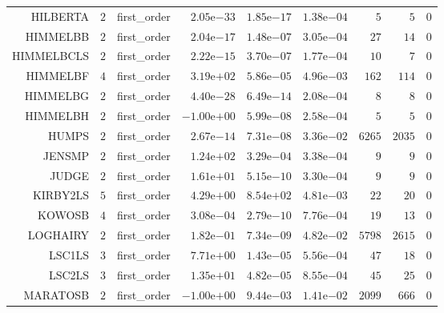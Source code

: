 \begin{longtable}{rrrrrrrrr}
HILBERTA & \(     2\) & first\_order & \( 2.05\)e\(-33\) & \( 1.85\)e\(-17\) & \( 1.38\)e\(-04\) & \(     5\) & \(     5\) & \(     0\) \\
HIMMELBB & \(     2\) & first\_order & \( 2.04\)e\(-17\) & \( 1.48\)e\(-07\) & \( 3.05\)e\(-04\) & \(    27\) & \(    14\) & \(     0\) \\
HIMMELBCLS & \(     2\) & first\_order & \( 2.22\)e\(-15\) & \( 3.70\)e\(-07\) & \( 1.77\)e\(-04\) & \(    10\) & \(     7\) & \(     0\) \\
HIMMELBF & \(     4\) & first\_order & \( 3.19\)e\(+02\) & \( 5.86\)e\(-05\) & \( 4.96\)e\(-03\) & \(   162\) & \(   114\) & \(     0\) \\
HIMMELBG & \(     2\) & first\_order & \( 4.40\)e\(-28\) & \( 6.49\)e\(-14\) & \( 2.08\)e\(-04\) & \(     8\) & \(     8\) & \(     0\) \\
HIMMELBH & \(     2\) & first\_order & \(-1.00\)e\(+00\) & \( 5.99\)e\(-08\) & \( 2.58\)e\(-04\) & \(     5\) & \(     5\) & \(     0\) \\
HUMPS & \(     2\) & first\_order & \( 2.67\)e\(-14\) & \( 7.31\)e\(-08\) & \( 3.36\)e\(-02\) & \(  6265\) & \(  2035\) & \(     0\) \\
JENSMP & \(     2\) & first\_order & \( 1.24\)e\(+02\) & \( 3.29\)e\(-04\) & \( 3.38\)e\(-04\) & \(     9\) & \(     9\) & \(     0\) \\
JUDGE & \(     2\) & first\_order & \( 1.61\)e\(+01\) & \( 5.15\)e\(-10\) & \( 3.30\)e\(-04\) & \(     9\) & \(     9\) & \(     0\) \\
KIRBY2LS & \(     5\) & first\_order & \( 4.29\)e\(+00\) & \( 8.54\)e\(+02\) & \( 4.81\)e\(-03\) & \(    22\) & \(    20\) & \(     0\) \\
KOWOSB & \(     4\) & first\_order & \( 3.08\)e\(-04\) & \( 2.79\)e\(-10\) & \( 7.76\)e\(-04\) & \(    19\) & \(    13\) & \(     0\) \\
LOGHAIRY & \(     2\) & first\_order & \( 1.82\)e\(-01\) & \( 7.34\)e\(-09\) & \( 4.82\)e\(-02\) & \(  5798\) & \(  2615\) & \(     0\) \\
LSC1LS & \(     3\) & first\_order & \( 7.71\)e\(+00\) & \( 1.43\)e\(-05\) & \( 5.56\)e\(-04\) & \(    47\) & \(    18\) & \(     0\) \\
LSC2LS & \(     3\) & first\_order & \( 1.35\)e\(+01\) & \( 4.82\)e\(-05\) & \( 8.55\)e\(-04\) & \(    45\) & \(    25\) & \(     0\) \\
MARATOSB & \(     2\) & first\_order & \(-1.00\)e\(+00\) & \( 9.44\)e\(-03\) & \( 1.41\)e\(-02\) & \(  2099\) & \(   666\) & \(     0\) \\

\end{longtable}
